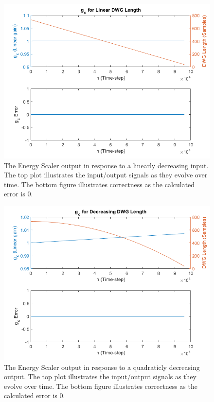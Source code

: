 \documentclass[../main.tex]{subfiles}
\begin{document}
\clearpage

\begin{figure}[h!]
    \centering
    \includegraphics[scale=.57]{./images/plots/EnergyScalerLinearDecreasing.png}
    \caption{The Energy Scaler output in response to a linearly decreasing input. The top plot illustrates the input/output signals as they evolve over time. The bottom figure illustrates correctness as the calculated error is 0.}
    \label{fig:EnergyScalerLinDec}
\end{figure}

\begin{figure}[h!]
    \centering
    \includegraphics[scale=.57]{./images/plots/EnergyScalerQuadraticDecreasing.png}
    \caption{The Energy Scaler output in response to a quadraticly decreasing output. The top plot illustrates the input/output signals as they evolve over time. The bottom figure illustrates correctness as the calculated error is 0.}
    \label{fig:EnergyScalerQuadDec}
\end{figure}
\end{document}
